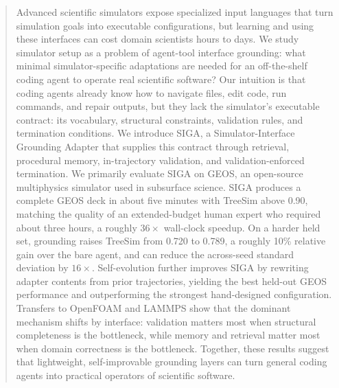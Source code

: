 \documentclass{article}
\begin{document}
\begin{abstract}
Advanced scientific simulators expose specialized input languages that turn simulation goals into executable configurations, but learning and using these interfaces can cost domain scientists hours to days. We study simulator setup as a problem of agent-tool interface grounding: what minimal simulator-specific adaptations are needed for an off-the-shelf coding agent to operate real scientific software? Our intuition is that coding agents already know how to navigate files, edit code, run commands, and repair outputs, but they lack the simulator's executable contract: its vocabulary, structural constraints, validation rules, and termination conditions. We introduce SIGA, a Simulator-Interface Grounding Adapter that supplies this contract through retrieval, procedural memory, in-trajectory validation, and validation-enforced termination. We primarily evaluate SIGA on GEOS, an open-source multiphysics simulator used in subsurface science. SIGA produces a complete GEOS deck in about five minutes with TreeSim above 0.90, matching the quality of an extended-budget human expert who required about three hours, a roughly $36\times$ wall-clock speedup. On a harder held set, grounding raises TreeSim from 0.720 to 0.789, a roughly 10\% relative gain over the bare agent, and can reduce the across-seed standard deviation by $16\times$.
Self-evolution further improves SIGA by rewriting adapter contents from prior trajectories, yielding the best held-out GEOS performance and outperforming the strongest hand-designed configuration. Transfers to OpenFOAM and LAMMPS show that the dominant mechanism shifts by interface: validation matters most when structural completeness is the bottleneck, while memory and retrieval matter most when domain correctness is the bottleneck. Together, these results suggest that lightweight, self-improvable grounding layers can turn general coding agents into practical operators of scientific software.

\end{abstract}
\end{document}
